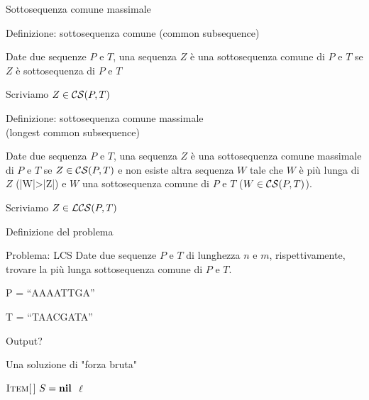 \begin{frame}{Sottosequenza comune massimale}


\begin{block}{Definizione: sottosequenza comune (\alert{common subsequence})}
\BIL
\item Date due sequenze $P$ e $T$, una sequenza $Z$ è una \alert{sottosequenza comune}
di $P$ e $T$ se $Z$ è sottosequenza di $P$ e $T$
\item Scriviamo $Z \in {\cal CS}(P,T)$
\EIL
\end{block}

\begin{block}{Definizione: sottosequenza comune massimale\\ (\alert{longest common subsequence})}
\BIL
\item Date due sequenza $P$ e $T$, una sequenza $Z$ è una \alert{sottosequenza comune massimale} 
di $P$ e $T$ se $Z \in {\cal CS}(P,T)$ e non esiste altra sequenza $W$ tale che
$W$ è più lunga di $Z$ (|W|>|Z|) e $W$ una sottosequenza comune di $P$ e $T$ ($W \in {\cal CS}(P,T)$).
\item Scriviamo $Z \in {\cal LCS}(P,T)$
\EIL
\end{block}

\end{frame}


\begin{frame}{Definizione del problema}

\begin{block}{Problema: LCS}
Date due sequenze $P$ e $T$ di lunghezza $n$ e $m$, rispettivamente, trovare
la più lunga sottosequenza comune di $P$ e $T$.
\end{block}

\bigskip
{}
\BIL
\item P = “AAAATTGA”
\item T = “TAACGATA”
\item Output?
\EIL


\end{frame}

\begin{frame}[shrink=5]{Una soluzione di "forza bruta"}
  
\vspace{-12pt}
\begin{Procedure}
\caption[A]{\INTEGER\ ($\Item[\,]\ P$, $\Item[\,]\ T$)}

  $\textsc{Item}[\,]\ S = \textbf{nil}$\;
  \Return $\ell$\;
\end{Procedure}
  
\end{frame}



